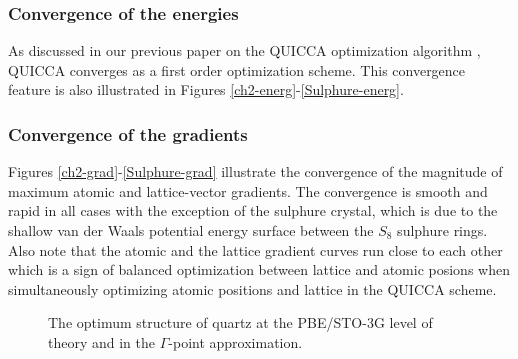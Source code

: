 \documentclass[prl,aps,preprint,superbib,12pt]{revtex4}
\begin{document}
\subsubsection{Convergence of the energies}
As discussed in our previous paper on the QUICCA optimization
algorithm \cite{KNemeth04}, QUICCA converges as a first
order optimization scheme. This convergence feature
is also illustrated in Figures \ref{ch2-energ}-\ref{Sulphure-energ}.

\subsubsection{Convergence of the gradients}
Figures \ref{ch2-grad}-\ref{Sulphure-grad} illustrate the convergence
of the magnitude of maximum atomic and lattice-vector gradients.
The convergence is smooth and rapid in all cases with the exception
of the sulphure crystal, which is due to the shallow van der Waals
potential energy surface between the $S_{8}$ sulphure rings.
Also note that the atomic and the lattice gradient curves run close
to each other which is a sign of balanced optimization
between lattice and atomic posions when simultaneously
optimizing atomic positions and lattice in the QUICCA scheme.

\begin{figure}[h]
\caption{The optimum structure of quartz at the PBE/STO-3G
level of theory and in the $\Gamma$-point approximation.}
\label{quartz}
\end{figure}
\end{document}

